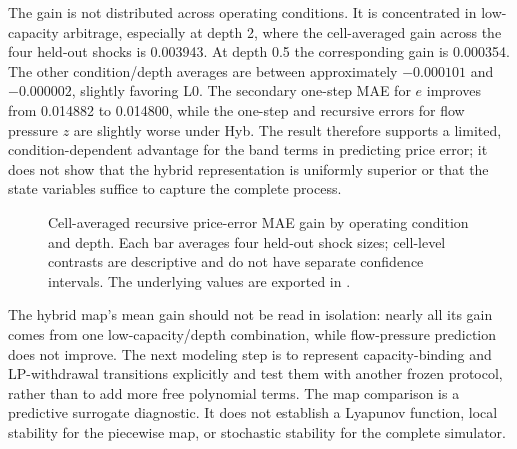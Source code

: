 The gain is not distributed across operating conditions. It is concentrated in low-capacity arbitrage, especially at depth 2, where the cell-averaged gain across the four held-out shocks is 0.003943. At depth 0.5 the corresponding gain is 0.000354. The other condition/depth averages are between approximately $-0.000101$ and $-0.000002$, slightly favoring L0. The secondary one-step MAE for $e$ improves from 0.014882 to 0.014800, while the one-step and recursive errors for flow pressure $z$ are slightly worse under Hyb. The result therefore supports a limited, condition-dependent advantage for the band terms in predicting price error; it does not show that the hybrid representation is uniformly superior or that the state variables suffice to capture the complete process.

\begin{figure}[H]
\centering
{}
\caption{Cell-averaged recursive price-error MAE gain by operating condition and depth. Each bar averages four held-out shock sizes; cell-level contrasts are descriptive and do not have separate confidence intervals. The underlying values are exported in .}
\label{fig:hybrid-cell-gains}
\end{figure}

The hybrid map’s mean gain should not be read in isolation: nearly all its gain comes from one low-capacity/depth combination, while flow-pressure prediction does not improve. The next modeling step is to represent capacity-binding and LP-withdrawal transitions explicitly and test them with another frozen protocol, rather than to add more free polynomial terms. The map comparison is a predictive surrogate diagnostic. It does not establish a Lyapunov function, local stability for the piecewise map, or stochastic stability for the complete simulator.

